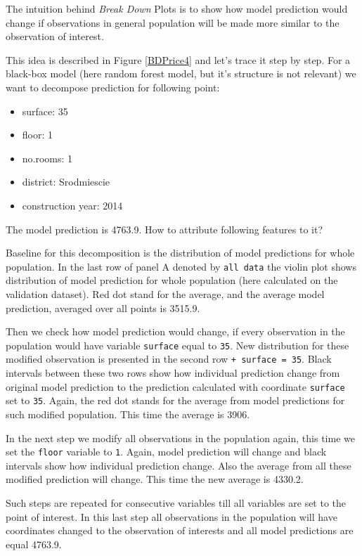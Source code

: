 \documentclass[]{book}
\providecommand{\tightlist}{%
  \setlength{\itemsep}{0pt}\setlength{\parskip}{0pt}}
\theoremstyle{definition}
\theoremstyle{definition}
\theoremstyle{definition}
\theoremstyle{remark}
\begin{document}
The intuition behind \emph{Break Down} Plots is to show how model
prediction would change if observations in general population will be
made more similar to the observation of interest.

This idea is described in Figure \ref{BDPrice4} and let's trace it step
by step. For a black-box model (here random forest model, but it's
structure is not relevant) we want to decompose prediction for following
point:

\begin{itemize}
\tightlist
\item
  surface: 35
\item
  floor: 1
\item
  no.rooms: 1
\item
  district: Srodmiescie
\item
  construction year: 2014
\end{itemize}

The model prediction is 4763.9. How to attribute following features to
it?

Baseline for this decomposition is the distribution of model predictions
for whole population. In the last row of panel A denoted by
\texttt{all\ data} the violin plot shows distribution of model
prediction for whole population (here calculated on the validation
dataset). Red dot stand for the average, and the average model
prediction, averaged over all points is 3515.9.

Then we check how model prediction would change, if every observation in
the population would have variable \texttt{surface} equal to
\texttt{35}. New distribution for these modified observation is
presented in the second row \texttt{+\ surface\ =\ 35}. Black intervals
between these two rows show how individual prediction change from
original model prediction to the prediction calculated with coordinate
\texttt{surface} set to \texttt{35}. Again, the red dot stands for the
average from model predictions for such modified population. This time
the average is 3906.

In the next step we modify all observations in the population again,
this time we set the \texttt{floor} variable to \texttt{1}. Again, model
prediction will change and black intervals show how individual
prediction change. Also the average from all these modified prediction
will change. This time the new average is 4330.2.

Such steps are repeated for consecutive variables till all variables are
set to the point of interest. In this last step all observations in the
population will have coordinates changed to the observation of interests
and all model predictions are equal 4763.9.
\end{document}
